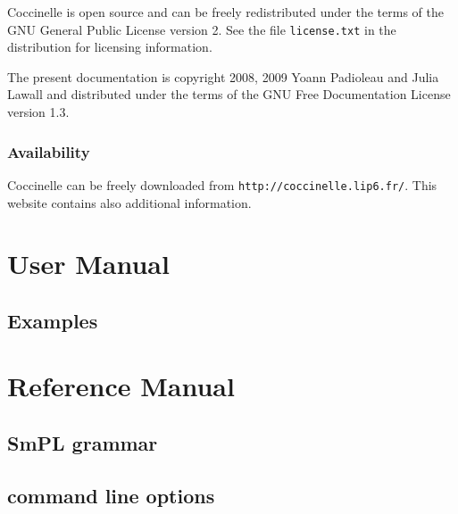 \documentclass{report}
\begin{document}
Coccinelle is open source and can be freely redistributed under the
terms of the GNU General Public License version 2. See the file
\verb+license.txt+ in the distribution for licensing information.

The present documentation is copyright 2008, 2009 Yoann Padioleau
and Julia Lawall and distributed under the terms of the
GNU Free Documentation License version 1.3.

\section*{Availability}

Coccinelle can be freely downloaded
from \verb+http://coccinelle.lip6.fr/+.
This website contains also additional information.


\part{User Manual}
\label{part:usermanual}







\chapter{Examples}
















\part{Reference Manual}
\label{part:refmanual}

\chapter{SmPL grammar}



\chapter{\spatch command line options}





{\small


}


\end{document}
